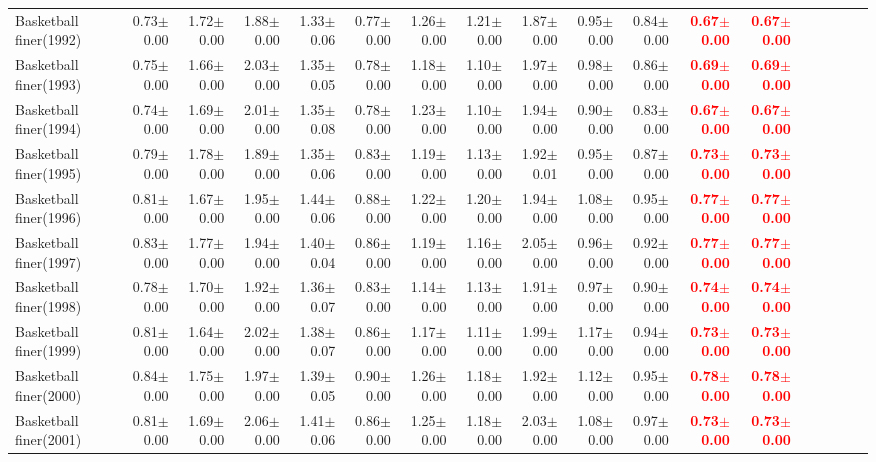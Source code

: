 \documentclass[nohyperref]{article}
\theoremstyle{plain}
\theoremstyle{definition}
\theoremstyle{remark}
\newcommand{\red}[1]{\textcolor{red}{\textbf{#1}}}
\begin{document}
\begin{table*}[!ht]
{\begin{tabular}{lrrrrrrrrrrrrrrrrr}
			Basketball finer(1992) & 0.73$\pm$0.00 & 1.72$\pm$0.00 & 1.88$\pm$0.00 & 1.33$\pm$0.06 & 0.77$\pm$0.00 & 1.26$\pm$0.00 & 1.21$\pm$0.00 & 1.87$\pm$0.00 & 0.95$\pm$0.00 & 0.84$\pm$0.00 & \red{0.67$\pm$0.00} & \red{0.67$\pm$0.00} \\
			Basketball finer(1993) & 0.75$\pm$0.00 & 1.66$\pm$0.00 & 2.03$\pm$0.00 & 1.35$\pm$0.05 & 0.78$\pm$0.00 & 1.18$\pm$0.00 & 1.10$\pm$0.00 & 1.97$\pm$0.00 & 0.98$\pm$0.00 & 0.86$\pm$0.00 & \red{0.69$\pm$0.00} & \red{0.69$\pm$0.00} \\
			Basketball finer(1994) & 0.74$\pm$0.00 & 1.69$\pm$0.00 & 2.01$\pm$0.00 & 1.35$\pm$0.08 & 0.78$\pm$0.00 & 1.23$\pm$0.00 & 1.10$\pm$0.00 & 1.94$\pm$0.00 & 0.90$\pm$0.00 & 0.83$\pm$0.00 & \red{0.67$\pm$0.00} & \red{0.67$\pm$0.00} \\
			Basketball finer(1995) & 0.79$\pm$0.00 & 1.78$\pm$0.00 & 1.89$\pm$0.00 & 1.35$\pm$0.06 & 0.83$\pm$0.00 & 1.19$\pm$0.00 & 1.13$\pm$0.00 & 1.92$\pm$0.01 & 0.95$\pm$0.00 & 0.87$\pm$0.00 & \red{0.73$\pm$0.00} & \red{0.73$\pm$0.00} \\
			Basketball finer(1996) & 0.81$\pm$0.00 & 1.67$\pm$0.00 & 1.95$\pm$0.00 & 1.44$\pm$0.06 & 0.88$\pm$0.00 & 1.22$\pm$0.00 & 1.20$\pm$0.00 & 1.94$\pm$0.00 & 1.08$\pm$0.00 & 0.95$\pm$0.00 & \red{0.77$\pm$0.00} & \red{0.77$\pm$0.00} \\
			Basketball finer(1997) & 0.83$\pm$0.00 & 1.77$\pm$0.00 & 1.94$\pm$0.00 & 1.40$\pm$0.04 & 0.86$\pm$0.00 & 1.19$\pm$0.00 & 1.16$\pm$0.00 & 2.05$\pm$0.00 & 0.96$\pm$0.00 & 0.92$\pm$0.00 & \red{0.77$\pm$0.00} & \red{0.77$\pm$0.00} \\
			Basketball finer(1998) & 0.78$\pm$0.00 & 1.70$\pm$0.00 & 1.92$\pm$0.00 & 1.36$\pm$0.07 & 0.83$\pm$0.00 & 1.14$\pm$0.00 & 1.13$\pm$0.00 & 1.91$\pm$0.00 & 0.97$\pm$0.00 & 0.90$\pm$0.00 & \red{0.74$\pm$0.00} & \red{0.74$\pm$0.00} \\
			Basketball finer(1999) & 0.81$\pm$0.00 & 1.64$\pm$0.00 & 2.02$\pm$0.00 & 1.38$\pm$0.07 & 0.86$\pm$0.00 & 1.17$\pm$0.00 & 1.11$\pm$0.00 & 1.99$\pm$0.00 & 1.17$\pm$0.00 & 0.94$\pm$0.00 & \red{0.73$\pm$0.00} & \red{0.73$\pm$0.00} \\
			Basketball finer(2000) & 0.84$\pm$0.00 & 1.75$\pm$0.00 & 1.97$\pm$0.00 & 1.39$\pm$0.05 & 0.90$\pm$0.00 & 1.26$\pm$0.00 & 1.18$\pm$0.00 & 1.92$\pm$0.00 & 1.12$\pm$0.00 & 0.95$\pm$0.00 & \red{0.78$\pm$0.00} & \red{0.78$\pm$0.00} \\
			Basketball finer(2001) & 0.81$\pm$0.00 & 1.69$\pm$0.00 & 2.06$\pm$0.00 & 1.41$\pm$0.06 & 0.86$\pm$0.00 & 1.25$\pm$0.00 & 1.18$\pm$0.00 & 2.03$\pm$0.00 & 1.08$\pm$0.00 & 0.97$\pm$0.00 & \red{0.73$\pm$0.00} & \red{0.73$\pm$0.00} \\

\end{tabular}}
\end{table*}
\end{document}
